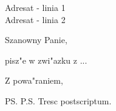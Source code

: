 \documentclass[12pt,a4paper]{letter}
\begin{document}
\begin{letter}{Adresat - linia 1 \\ Adresat - linia 2}

\signature{Adam Kowalski}

\date{10 marca 2001}

\address{Firma Bez Nazwy \\ 
ulica Szeroka 123 \\ 30-001 Krak"ow, Polska}

\opening{Szanowny Panie,}
pisz"e w zwi"azku z ...

\closing{Z powa"raniem,}

\ps P.S. Tresc postscriptum.



\end{letter}
\end{document}
